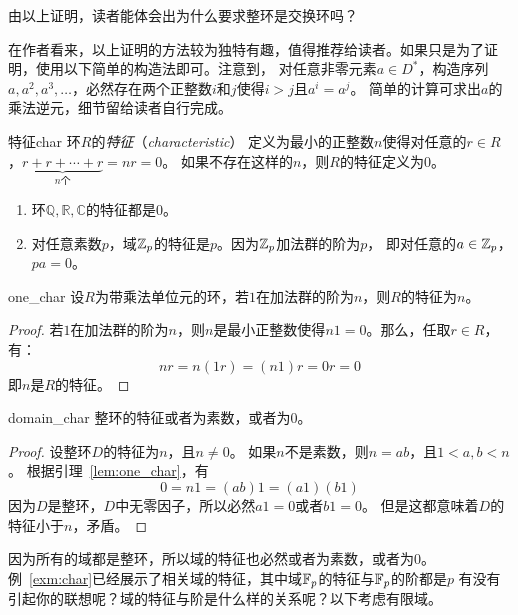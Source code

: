\begin{remark}
由以上证明，读者能体会出为什么要求整环是交换环吗？
\end{remark}
在作者看来，以上证明的方法较为独特有趣，值得推荐给读者。如果只是为了证明，使用以下简单的构造法即可。注意到，
对任意非零元素$a \in D^*$，构造序列$a, a^2, a^3, \ldots$，必然存在两个正整数$i$和$j$使得$i > j$且$a^i = a^j$。
简单的计算可求出$a$的乘法逆元，细节留给读者自行完成。%

\begin{definition}{特征}{char}
环$R$的\emph{特征}（\emph{characteristic}）
定义为最小的正整数$n$使得对任意的$r\in R$，$\underbrace{r + r + \cdots + r}_{n\text{个}} = nr = 0 $。
如果不存在这样的$n$，则$R$的特征定义为$0$。
\end{definition}

\begin{example}
\label{exm:char}
\begin{enumerate} 
\item 环$\mathbb{Q}, \mathbb{R}, \mathbb{C}$的特征都是$0$。

\item 对任意素数$p$，域${\mathbb Z}_p$的特征是$p$。因为${\mathbb Z}_p$加法群的阶为$p$，
即对任意的$a \in {\mathbb Z}_p$，$pa = 0$。
\end{enumerate}
\end{example}

\begin{lemma}{}{one_char}
设$R$为带乘法单位元的环，若$1$在加法群的阶为$n$，则$R$的特征为$n$。
\end{lemma}

\begin{proof}
若$1$在加法群的阶为$n$，则$n$是最小正整数使得$n1 = 0$。那么，任取$r\in R$，有：
\[n r = n(1 r) = (n1)r = 0r = 0\]
即$n$是$R$的特征。
\end{proof}

\begin{proposition}{}{domain_char}
整环的特征或者为素数，或者为$0$。
\end{proposition}

\begin{proof}
设整环$D$的特征为$n$，且$n \neq 0$。
如果$n$不是素数，则$n = a b$，且$1 < a, b < n$。
根据引理~\ref{lem:one_char}，有
\[ 0 = n 1 = (ab)1 = (a1)(b1)\]
因为$D$是整环，$D$中无零因子，所以必然$a1 = 0$或者$b1=0$。
但是这都意味着$D$的特征小于$n$，矛盾。
\end{proof}

因为所有的域都是整环，所以域的特征也必然或者为素数，或者为$0$。
例~\ref{exm:char}已经展示了相关域的特征，其中域${\mathbb F}_p$的特征与${\mathbb F}_p$的阶都是$p$
有没有引起你的联想呢？域的特征与阶是什么样的关系呢？以下考虑有限域。

